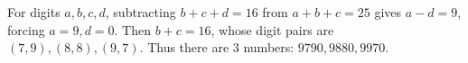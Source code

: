 For digits $a,b,c,d$, subtracting $b+c+d=16$ from $a+b+c=25$ gives $a-d=9$, forcing $a=9,d=0$. Then $b+c=16$, whose digit pairs are $(7,9),(8,8),(9,7)$. Thus there are $\boxed3$ numbers: $9790,9880,9970$.
